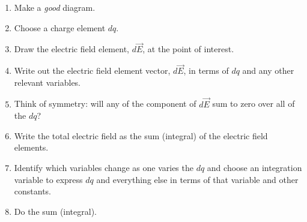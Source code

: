 \begin{enumerate}
\item Make a \textit{good} diagram.
\item Choose a charge element $dq$.
\item Draw the electric field element, $d\vec E$, at the point of interest.
\item Write out the electric field element vector, $d\vec E$, in terms of $dq$ and any other relevant variables.
\item Think of symmetry: will any of the component of $d\vec E$ sum to zero over all of the $dq$?
\item Write the total electric field as the sum (integral) of the electric field elements.
\item Identify which variables change as one varies the $dq$ and choose an integration variable to express $dq$ and everything else in terms of that variable and other constants.
\item Do the sum (integral).
\end{enumerate}

